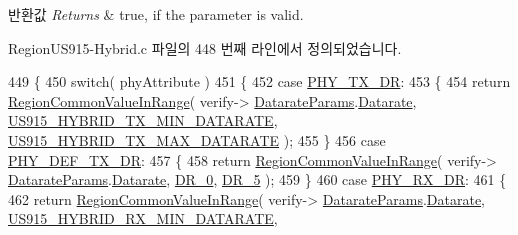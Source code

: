 \begin{DoxyRetVals}{반환값}
{\em Returns} & true, if the parameter is valid. \\
\hline
\end{DoxyRetVals}


Region\+U\+S915-\/\+Hybrid.\+c 파일의 448 번째 라인에서 정의되었습니다.


\begin{DoxyCode}
449 \{
450     \textcolor{keywordflow}{switch}( phyAttribute )
451     \{
452         \textcolor{keywordflow}{case} \mbox{\hyperlink{group___r_e_g_i_o_n_gga51cbe8f5433d914fe9cf81b451de2c2da62c19af9dc2c54540562e1158c015f57}{PHY\_TX\_DR}}:
453         \{
454             \textcolor{keywordflow}{return} \mbox{\hyperlink{group___r_e_g_i_o_n_c_o_m_m_o_n_gafdd1c80d953e18d755a631b72a9c3bd3}{RegionCommonValueInRange}}( verify->
      \mbox{\hyperlink{unionu_verify_params_a92427be16343eb3d9c14334eb95ec058}{DatarateParams}}.\mbox{\hyperlink{structu_verify_params_1_1s_datarate_params_ae2f6080f3aa0e9485c55513ca56bb24d}{Datarate}}, \mbox{\hyperlink{group___r_e_g_i_o_n_u_s915_h_y_b_ga6c7ab6789cb7bb1a5c1e22833905f787}{US915\_HYBRID\_TX\_MIN\_DATARATE}}, 
      \mbox{\hyperlink{group___r_e_g_i_o_n_u_s915_h_y_b_ga41872f6bb20d1dca0b778205ada36348}{US915\_HYBRID\_TX\_MAX\_DATARATE}} );
455         \}
456         \textcolor{keywordflow}{case} \mbox{\hyperlink{group___r_e_g_i_o_n_gga51cbe8f5433d914fe9cf81b451de2c2da70c3923333165960549162e3dcf10467}{PHY\_DEF\_TX\_DR}}:
457         \{
458             \textcolor{keywordflow}{return} \mbox{\hyperlink{group___r_e_g_i_o_n_c_o_m_m_o_n_gafdd1c80d953e18d755a631b72a9c3bd3}{RegionCommonValueInRange}}( verify->
      \mbox{\hyperlink{unionu_verify_params_a92427be16343eb3d9c14334eb95ec058}{DatarateParams}}.\mbox{\hyperlink{structu_verify_params_1_1s_datarate_params_ae2f6080f3aa0e9485c55513ca56bb24d}{Datarate}}, \mbox{\hyperlink{group___r_e_g_i_o_n_ga6c4ef966b4f3d5eb7597b087f2b97095}{DR\_0}}, \mbox{\hyperlink{group___r_e_g_i_o_n_ga872e12c82020c02a7f70a1c6ed1375df}{DR\_5}} );
459         \}
460         \textcolor{keywordflow}{case} \mbox{\hyperlink{group___r_e_g_i_o_n_gga51cbe8f5433d914fe9cf81b451de2c2da8cc3b895173b07ee71127e366c8d0d55}{PHY\_RX\_DR}}:
461         \{
462             \textcolor{keywordflow}{return} \mbox{\hyperlink{group___r_e_g_i_o_n_c_o_m_m_o_n_gafdd1c80d953e18d755a631b72a9c3bd3}{RegionCommonValueInRange}}( verify->
      \mbox{\hyperlink{unionu_verify_params_a92427be16343eb3d9c14334eb95ec058}{DatarateParams}}.\mbox{\hyperlink{structu_verify_params_1_1s_datarate_params_ae2f6080f3aa0e9485c55513ca56bb24d}{Datarate}}, \mbox{\hyperlink{group___r_e_g_i_o_n_u_s915_h_y_b_gaf3c327837e52fbc665c3857f3731c5fe}{US915\_HYBRID\_RX\_MIN\_DATARATE}}, 

\end{DoxyCode}
